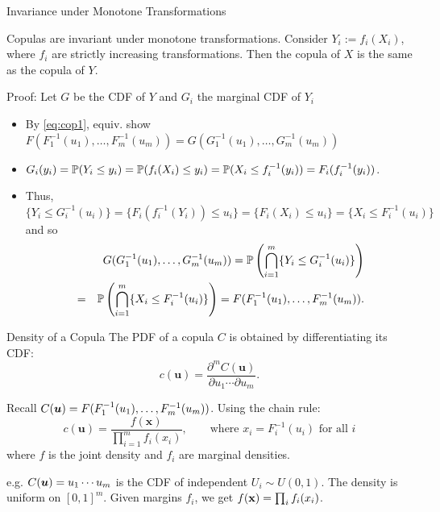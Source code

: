 \documentclass[11pt,handout,aspectratio=169]{beamer}
\begin{document}
\begin{frame}{Invariance under Monotone Transformations}
\begin{alertblock}{Copulas are invariant under monotone transformations. }
	Consider $Y_i := f_i(X_i)$, where $f_i$ are strictly increasing transformations. Then the copula of $X$ is the same as the copula of $Y$. 
\end{alertblock}
Proof: Let $G$ be the CDF of $Y$ and $G_i$ the marginal CDF of $Y_i$
    \begin{itemize}
    \item By \eqref{eq:cop1}, equiv. show $F(F_1^{-1}(u_1), \ldots, F_m^{-1}(u_m))=G(G_1^{-1}(u_1), \ldots, G_m^{-1}(u_m))$
        \item $G_i(y_i)=\P(Y_i\leq y_i)=\P(f_i(X_i)\leq y_i)=\P(X_i\leq f_i^{-1}(y_i))=F_i(f_i^{-1}(y_i))$.
        \item Thus, $\{Y_i\leq G_i^{-1}(u_i)\}=\{F_i(f_i^{-1}(Y_i))\leq u_i\}=\{F_i(X_i)\leq u_i\}=\{X_i\leq F^{-1}_i(u_i)\}$ and so  
      \begin{eqnarray*}
      	&&G(G_1^{-1}(u_1),\ldots, G_m^{-1}(u_m))= \P\left(\bigcap_{i=1}^m \{Y_i\leq G^{-1}_i(u_i)\}\right)\\
      	&=&\P\left(\bigcap_{i=1}^m \{X_i\leq F^{-1}_i(u_i)\}\right)=F(F_1^{-1}(u_1), \ldots, F_m^{-1}(u_m)).
      \end{eqnarray*} 
    \end{itemize}
\end{frame}

\begin{frame}{Density of a Copula}
The PDF of a copula $C$ is obtained by differentiating its CDF:
    \[ c(\mathbf{u}) = \frac{\partial^m C(\mathbf{u})}{\partial u_1 \cdots \partial u_m}. \]
    
    Recall $C(\bs u)=F(F_1^{-1}(u_1),\ldots, F_m^{-1}(u_m))$. Using the chain rule:
    \[ c(\mathbf{u}) = \frac{f(\mathbf{x})}{\prod_{i=1}^m f_i(x_i)},\qquad \mbox{where } x_i=F_i^{-1}(u_i)\mbox{ for all }i \]
    where $f$ is the joint density and $f_i$ are marginal densities.
    \bigskip
    
    e.g. $C(\bs u)=u_1\cdots u_m$ is the CDF of independent $U_i\sim U(0,1)$. The density is uniform on $[0,1]^m$. Given margins $f_i$, we get $f(\x)=\prod_i f_i(x_i)$.
\end{frame}
\end{document}
